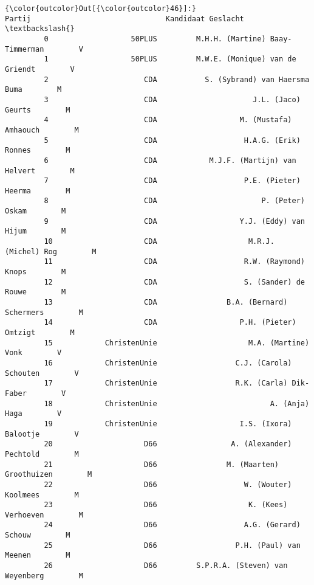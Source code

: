 \documentclass{article}
\begin{document}
            \begin{Verbatim}[commandchars=\\\{\}]
{\color{outcolor}Out[{\color{outcolor}46}]:}                     Partij                               Kandidaat Geslacht  \textbackslash{}
         0                   50PLUS         M.H.H. (Martine) Baay-Timmerman        V   
         1                   50PLUS         M.W.E. (Monique) van de Griendt        V   
         2                      CDA           S. (Sybrand) van Haersma Buma        M   
         3                      CDA                      J.L. (Jaco) Geurts        M   
         4                      CDA                   M. (Mustafa) Amhaouch        M   
         5                      CDA                    H.A.G. (Erik) Ronnes        M   
         6                      CDA            M.J.F. (Martijn) van Helvert        M   
         7                      CDA                    P.E. (Pieter) Heerma        M   
         8                      CDA                        P. (Peter) Oskam        M   
         9                      CDA                   Y.J. (Eddy) van Hijum        M   
         10                     CDA                     M.R.J. (Michel) Rog        M   
         11                     CDA                    R.W. (Raymond) Knops        M   
         12                     CDA                    S. (Sander) de Rouwe        M   
         13                     CDA                B.A. (Bernard) Schermers        M   
         14                     CDA                   P.H. (Pieter) Omtzigt        M   
         15            ChristenUnie                     M.A. (Martine) Vonk        V   
         16            ChristenUnie                  C.J. (Carola) Schouten        V   
         17            ChristenUnie                  R.K. (Carla) Dik-Faber        V   
         18            ChristenUnie                          A. (Anja) Haga        V   
         19            ChristenUnie                   I.S. (Ixora) Balootje        V   
         20                     D66                 A. (Alexander) Pechtold        M   
         21                     D66                M. (Maarten) Groothuizen        M   
         22                     D66                    W. (Wouter) Koolmees        M   
         23                     D66                     K. (Kees) Verhoeven        M   
         24                     D66                    A.G. (Gerard) Schouw        M   
         25                     D66                  P.H. (Paul) van Meenen        M   
         26                     D66         S.P.R.A. (Steven) van Weyenberg        M   

\end{Verbatim}
\end{document}
